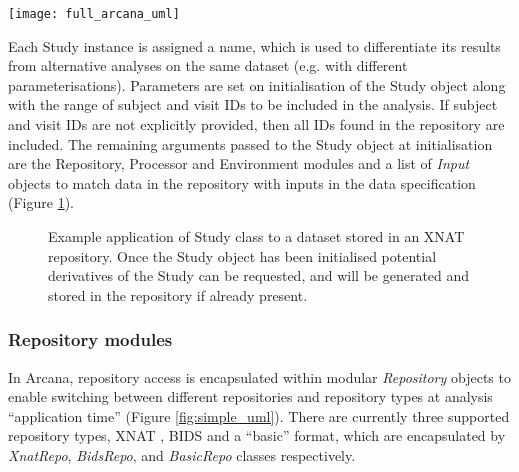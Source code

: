 \documentclass[smallextended]{svjour3}       %
\begin{document}
\begin{figure*}
	\centering
    \texttt{[image: full\_arcana\_uml]}
  \caption{Detailed Unified Modelling Language (UML) diagram of
information flow in the Arcana framework. Boxes: Python classes
(blue=core, green=interchangeable modules, grey=example
specialisations). Arrows: orange=data, magenta=workflow description,
diamond=aggregated-in, triangle=subclass-of. Calling \emph{data(name)}
on a Study subclass constructs the requisite pipelines (as specified in
\emph{data\_specs}) to produce the requested data, and sends them
to the \emph{Processor} to be processed. Data is selected by
\emph{Input} objects, pulled to the compute environment to be
processed, and then the derivatives are pushed back to the repository.
Repositories can be of plain directories, or BIDS or XNAT repositories}
\label{fig:full_uml}
\end{figure*}

Each Study instance is assigned a name, which is used to differentiate its
results from alternative analyses on the same dataset (e.g. with different
parameterisations). Parameters are set on initialisation of the Study object
along with the range of subject and visit IDs to be included in the analysis.
If subject and visit IDs are not explicitly provided, then all IDs found in the repository are included.
The remaining arguments passed to the Study object at initialisation are the
Repository, Processor and Environment modules and a list of
\emph{Input} objects to match data in the repository with inputs in the
data specification (Figure \ref{fig:study_application}).

\begin{figure}

\caption{Example application of Study class to a dataset stored in an XNAT
repository. Once the Study object has been initialised potential
derivatives of the Study can be requested, and will be generated and
stored in the repository if already present.}
\label{fig:study_application}
\end{figure}

\subsubsection*{Repository modules}\label{repository-modules}

In Arcana, repository access is encapsulated within modular
\emph{Repository} objects to enable switching between different
repositories and repository types at analysis ``application time''
(Figure \ref{fig:simple_uml}). There are currently three supported repository types, XNAT
\citep{marcus_extensible_2007}, BIDS \citep{gorgolewski_brain_2016} and a
``basic'' format, which are encapsulated by \emph{XnatRepo},
\emph{BidsRepo}, and \emph{BasicRepo} classes
respectively.
\end{document}
